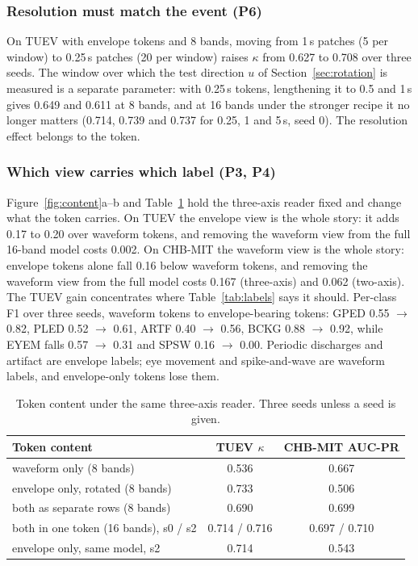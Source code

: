 \subsubsection{Resolution must match the event (P6)}
On TUEV with envelope tokens and 8 bands, moving from 1\,s patches (5 per window) to 0.25\,s patches (20 per window) raises $\kappa$ from 0.627 to 0.708 over three seeds. The window over which the test direction $u$ of Section~\ref{sec:rotation} is measured is a separate parameter: with 0.25\,s tokens, lengthening it to 0.5 and 1\,s gives 0.649 and 0.611 at 8 bands, and at 16 bands under the stronger recipe it no longer matters (0.714, 0.739 and 0.737 for 0.25, 1 and 5\,s, seed 0). The resolution effect belongs to the token.

\subsubsection{Which view carries which label (P3, P4)}
\label{sec:views}
Figure~\ref{fig:content}a--b and Table~\ref{tab:views} hold the three-axis reader fixed and change what the token carries. On TUEV the envelope view is the whole story: it adds 0.17 to 0.20 over waveform tokens, and removing the waveform view from the full 16-band model costs 0.002. On CHB-MIT the waveform view is the whole story: envelope tokens alone fall 0.16 below waveform tokens, and removing the waveform view from the full model costs 0.167 (three-axis) and 0.062 (two-axis). The TUEV gain concentrates where Table~\ref{tab:labels} says it should. Per-class F1 over three seeds, waveform tokens to envelope-bearing tokens: GPED 0.55 $\to$ 0.82, PLED 0.52 $\to$ 0.61, ARTF 0.40 $\to$ 0.56, BCKG 0.88 $\to$ 0.92, while EYEM falls 0.57 $\to$ 0.31 and SPSW 0.16 $\to$ 0.00. Periodic discharges and artifact are envelope labels; eye movement and spike-and-wave are waveform labels, and envelope-only tokens lose them.

\begin{table}[t]
\centering
\TableStyle
\caption{Token content under the same three-axis reader. Three seeds unless a seed is given.}
\label{tab:views}
\setlength{\tabcolsep}{3pt}
\begin{tabular}{@{}lcc@{}}
\toprule
Token content & TUEV $\kappa$ & CHB-MIT AUC-PR \\
\midrule
waveform only (8 bands) & 0.536 & 0.667 \\
envelope only, rotated (8 bands) & 0.733 & 0.506 \\
both as separate rows (8 bands) & 0.690 & 0.699 \\
both in one token (16 bands), s0 / s2 & 0.714 / 0.716 & 0.697 / 0.710 \\
\quad envelope only, same model, s2 & 0.714 & 0.543 \\
\bottomrule
\end{tabular}
\end{table}

